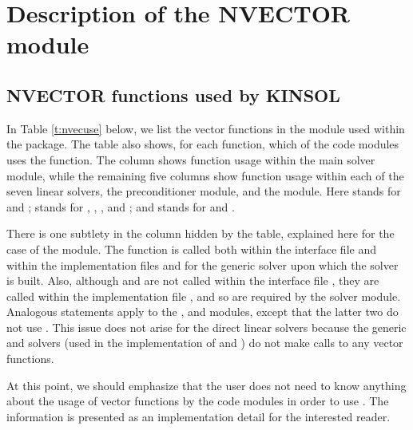 \chapter{Description of the NVECTOR module}\label{s:nvector}



\section{NVECTOR functions used by KINSOL}

In Table \ref{t:nvecuse} below, we list the vector functions in the 
{\nvector} module used within the {\kinsol} package.
The table also shows, for each function, which of the code modules uses
the function. The {\kinsol} column shows function usage within the main
solver module, while the remaining five columns show function
usage within each of the seven {\kinsol} linear solvers, 
the {\kinbbdpre} preconditioner module, and the {\fkinsol} module.
Here {\kindls} stands for {\kindense} and {\kinband}; {\kinspils} stands
for {\kinspgmr}, {\kinspfgmr}, {\kinspbcg}, and {\kinsptfqmr}; and {\kinsls}
stands for {\kinklu} and {\kinsuperlumt}.

There is one subtlety in the {\kinspils} column hidden by the table, explained
here for the case of the {\kinspgmr} module. 
The  function is called both within the interface file
 and within the implementation
files  and  for the generic
{\spgmr} solver upon which the {\kinspgmr} solver is built.  Also, although
 and  are not called within the interface file
, they are called within the implementation file
, and so are required by the {\kinspgmr} solver module.
Analogous statements apply to the 
{\kinspfgmr}, {\kinspbcg} and {\kinsptfqmr} modules,
except that the latter two do not use .
This issue does not arise for the direct {\kinsol} linear solvers because
the generic {\dense} and {\band} solvers (used in the implementation of
{\kindense} and {\kinband}) do not make calls to any vector functions.

At this point, we should emphasize that the {\kinsol} user does not need to know 
anything about the usage of vector functions by the {\kinsol} code modules in order 
to use {\kinsol}. The information is presented as an implementation detail for the 
interested reader.

